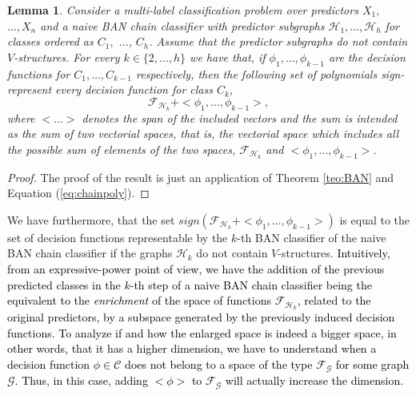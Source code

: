 \documentclass[11pt,a4paper, twoside]{book}
\newtheorem{lemma}{Lemma}[chapter]
\begin{document}
\begin{lemma}
Consider a multi-label classification problem over predictors $X_1,$ $\ldots,X_n$ and a naive BAN chain classifier with predictor subgraphs $\mathcal{H}_1,\ldots,\mathcal{H}_h$ for classes ordered as $C_1,$ $\ldots$, $C_h$. Assume that the predictor subgraphs do not contain $V$-structures.
For every $k\in \{2,\ldots,h\}$ we have that, if $\phi_1,\ldots,\phi_{k-1}$ are the decision functions for $C_1,\ldots,C_{k-1}$ respectively, then the following set of polynomials sign-represent every decision function for class $C_k$,
$$ \mathcal{F}_{\mathcal{H}_k} + <\phi_{1},\ldots,\phi_{{k-1}}> ,$$
where $<\ldots >$ denotes the span of the included vectors and the sum is intended as the sum of two vectorial spaces, that is, the vectorial space which includes all the possible sum of elements of the two  spaces, $\mathcal{F}_{\mathcal{H}_k}$ and  $<\phi_{1},\dots,\phi_{{k-1}}>$.
\end{lemma}
\begin{proof}
The proof of the result is just an application of Theorem \ref{teo:BAN} and Equation (\ref{eq:chainpoly}).
\end{proof}

We have furthermore, that the set $sign\left(\mathcal{F}_{\mathcal{H}_k}+<\phi_{1},\ldots,\phi_{{k-1}}>\right)$ is equal to the set of decision functions representable by the $k$-th BAN classifier of the naive BAN chain classifier if the graphs $\mathcal{H}_k$ do not contain $V$-structures.
\textcolor{black}{Intuitively, from an expressive-power point of view, we have the addition of the previous predicted classes in the $k$-th step of a naive BAN chain classifier being the equivalent to the \textit{enrichment} of the space of functions $\mathcal{F}_{\mathcal{H}_k}$, related to the original predictors, by a subspace generated by the previously induced decision functions.
To analyze if and how the enlarged space is indeed a bigger space, in other words, that it has a higher dimension, we have to understand when a decision function $\phi \in \mathcal{C}$ does not belong to a space of the type $\mathcal{F}_{\mathcal{G}}$ for some graph $\mathcal{G}$. Thus, in this case, adding $<\phi>$ to $\mathcal{F}_{\mathcal{G}}$ will actually increase the dimension.}
\end{document}
